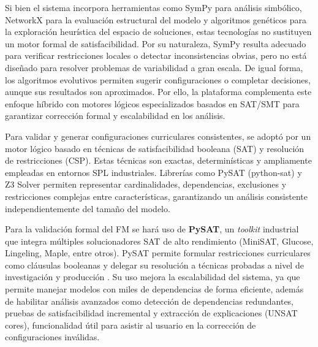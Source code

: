 {{        Si bien el sistema incorpora herramientas como SymPy para análisis 
        simbólico, NetworkX para la evaluación estructural del modelo y 
        algoritmos genéticos para la exploración heurística del espacio de 
        soluciones, estas tecnologías no sustituyen un motor formal de 
        satisfacibilidad. Por su naturaleza, SymPy resulta adecuado para 
        verificar restricciones locales o detectar inconsistencias obvias, 
        pero no está diseñado para resolver problemas de variabilidad a gran 
        escala. De igual forma, los algoritmos evolutivos permiten sugerir 
        configuraciones o completar decisiones, aunque sus resultados son 
        aproximados. Por ello, la plataforma complementa este enfoque híbrido 
        con motores lógicos especializados basados en SAT/SMT para garantizar 
        corrección formal y escalabilidad en los análisis.

        Para validar y generar configuraciones curriculares consistentes, 
        se adoptó por un motor lógico basado en técnicas de satisfacibilidad 
        booleana (SAT) y resolución de restricciones (CSP). Estas técnicas son exactas, 
        determinísticas y ampliamente empleadas en entornos SPL industriales. 
        Librerías como PySAT (python-sat) y Z3 Solver permiten representar 
        cardinalidades, dependencias, exclusiones y restricciones complejas entre 
        características, garantizando un análisis consistente independientemente del 
        tamaño del modelo.

        Para la validación formal del FM se hará uso de
        \textbf{PySAT}, un \textit{toolkit} industrial que integra múltiples solucionadores 
        SAT de alto rendimiento (MiniSAT, Glucose, Lingeling, Maple, entre otros).
        PySAT permite formular restricciones curriculares como cláusulas booleanas 
        y delegar su resolución a técnicas probadas a nivel de investigación y 
        producción \citep{pysat2018}. Su uso mejora la escalabilidad del sistema, 
        ya que permite manejar modelos con miles de dependencias de forma 
        eficiente, además de habilitar análisis avanzados como detección de 
        dependencias redundantes, pruebas de satisfacibilidad incremental y 
        extracción de explicaciones (UNSAT cores), funcionalidad útil para 
        asistir al usuario en la corrección de configuraciones inválidas.

}}
